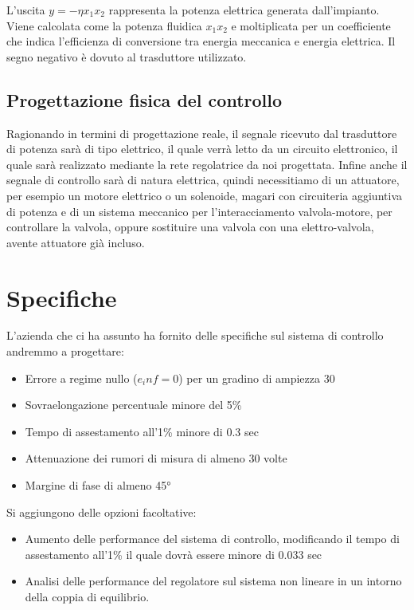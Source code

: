 \documentclass{article}
\begin{document}
L'uscita $y=-\eta x_1 x_2$ rappresenta la potenza elettrica generata dall'impianto. Viene calcolata come la potenza fluidica $x_1 x_2$ e moltiplicata per un coefficiente che indica l'efficienza di conversione tra energia meccanica e energia elettrica. Il segno negativo è dovuto al trasduttore utilizzato.

\subsection{Progettazione fisica del controllo}

Ragionando in termini di progettazione reale, il segnale ricevuto dal trasduttore di potenza sarà di tipo elettrico, il quale verrà letto da un circuito elettronico, il quale sarà realizzato mediante la rete regolatrice da noi progettata. 
Infine anche il segnale di controllo sarà di natura elettrica, quindi necessitiamo di un attuatore, per esempio un motore elettrico o un solenoide, magari con circuiteria aggiuntiva di potenza e di un sistema meccanico per l'interacciamento valvola-motore, per controllare la valvola, oppure sostituire una valvola con una elettro-valvola, avente attuatore già incluso.

\section{Specifiche}

L'azienda che ci ha assunto ha fornito delle specifiche sul sistema di controllo andremmo a progettare:

\begin{itemize}
    \item Errore a regime nullo ($e_inf=0$) per un gradino di ampiezza 30
    \item Sovraelongazione percentuale minore del 5\%
    \item Tempo di assestamento all'1\% minore di 0.3 sec
    \item Attenuazione dei rumori di misura di almeno 30 volte
    \item Margine di fase di almeno 45°
\end{itemize}

Si aggiungono delle opzioni facoltative:
\begin{itemize}
    \item Aumento delle performance del sistema di controllo, modificando il tempo di assestamento all'1\% il quale dovrà essere minore di 0.033 sec
    \item Analisi delle performance del regolatore sul sistema non lineare in un intorno della coppia di equilibrio.
\end{itemize}
\end{document}
